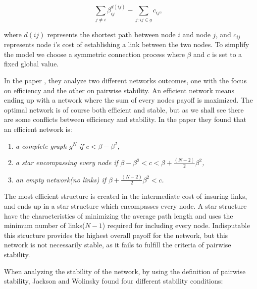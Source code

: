 \begin{equation}
\sum_{j\neq i}^{} \beta_{ij}^{d(ij)} - \sum_{j:ij\in g}^{} {c}_{ij}, 
\label{eq:connecetionGame}
\end{equation}

where $d(ij)$ represents the shortest path between node $i $ and node $j $, and ${c}_{ij}$ represents node i's cost of establishing a link between the two nodes. To simplify the model we choose a symmetric connection process where $\beta$ and $c$ is set to a fixed global value. 

In the paper \cite{jackson1996strategic}, they analyze two different networks outcomes, one with the focus on efficiency and the other on  pairwise stability. An efficient network means ending up with a network where the sum of every nodes payoff is maximized. The optimal network is of course both efficient and stable, but as we shall see there are some conflicts between efficiency and stability. In the paper they found that an efficient network is:
\begin{enumerate}
\item \textit{a complete graph $g^N$ if $c<\beta - \beta^2$,}
\item \textit{a star encompassing every node if $\beta - \beta^2 < c < \beta + \frac{(N-2)}{2}\beta^2$,}
\item \textit{an empty network(no links) if $\beta + \frac{(N-2)}{2}\beta^2 < c$.}
\end{enumerate}

The most efficient structure is created in the intermediate cost of insuring links, and ends up in a star structure which encompasses every node. A star structure have the characteristics of minimizing the average path length and uses the minimum number of links($N-1$) required for including every node. 
Indisputable this structure provides the highest overall payoff for the network, but this network is not necessarily stable, as it fails to fulfill the criteria of pairwise stability.


When analyzing the stability of the network, by using the definition of pairwise stability, Jackson and Wolinsky found four different stability conditions:

